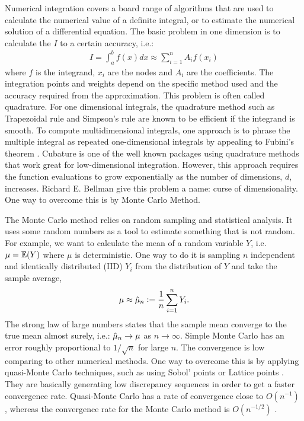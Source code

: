 \documentclass{iitthesis}
\theoremstyle{definition}
\begin{document}
Numerical integration covers a board range of algorithms that are used to calculate the numerical value of a definite integral, or to estimate the numerical solution of a differential equation.
The basic problem in one dimension is to calculate the $I$ to a certain accuracy, i.e.:
\begin{align}
I = \int_a^b f(x)dx \approx \sum_{i=1}^nA_i f(x_i)
\end{align}
where $f$ is the integrand, $x_i$ are the nodes and $A_i$ are the coefficients. The integration points and weights depend on the specific method used and the accuracy required from the approximation. This problem is often called quadrature. For one dimensional integrals, the quadrature method such as Trapezoidal rule and Simpson's rule are known to be efficient if the integrand is smooth. To compute multidimensional integrals, one approach is to phrase the multiple integral as repeated one-dimensional integrals by appealing to Fubini's theorem \cite{Fubini1907}. Cubature \cite{cubature} is one of the well known packages using quadrature methods that work great for low-dimensional integration. However, this approach requires the function evaluations to grow exponentially as the number of dimensions, $d$, increases. Richard E. Bellman give this problem a name: curse of dimensionality. One way to overcome this is by Monte Carlo Method.


The Monte Carlo method relies on random sampling and statistical analysis. It uses some random numbers as a tool to estimate something that is not random. For example, we want to calculate the mean of a random variable $Y$, i.e. $\mu=\mathbb{E}(Y)$ where $\mu$ is deterministic.  One way to do it is sampling $n$ independent and identically distributed (IID) $Y_i$ from the distribution of $Y$ and take the sample average, 
$$\mu \approx \hat{\mu}_n :=\frac1n\sum_{i=1}^nY_i.$$
The strong law of large numbers states that the sample mean converge to the true mean almost surely, i.e.: $\hat{\mu}_n \to \mu$ as $n \to \infty$. Simple Monte Carlo has an error roughly proportional to $1/\sqrt{n}$ for large $n$. The convergence is low comparing to other numerical methods. One way to overcome this is by applying quasi-Monte Carlo techniques, such as using Sobol' points \cite{Sobol67, Sobol76}or Lattice points \cite{Glasserman03}. They are basically generating low discrepancy sequences in order to get a faster convergence rate. Quasi-Monte Carlo has a rate of convergence close to $O(n^{-1})$ \cite{Glasserman03}, whereas the convergence rate for the Monte Carlo method is $O(n^{-1/2})$ \cite{Glasserman03}.
\end{document}
